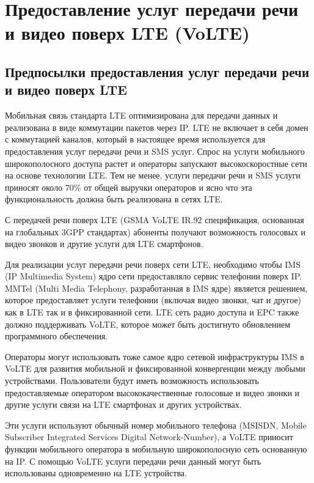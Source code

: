 \section{Предоставление услуг передачи речи и видео поверх LTE (VoLTE)} \label{sect1_4}
\subsection{Предпосылки предоставления услуг передачи речи и видео поверх LTE}


Мобильная связь стандарта LTE оптимизирована для передачи данных и реализована в виде коммутации пакетов через IP. LTE не включает в себя домен с коммутацией каналов, который в настоящее время используется для предоставления услуг передачи речи и SMS услуг. Спрос на услуги мобильного широкополосного доступа растет и операторы запускают высокоскоростные сети на основе технологии LTE. Тем не менее, услуги передачи речи и SMS услуги приносят около 70\% от общей выручки операторов и ясно что эта функциональность должна быть реализована в сетях LTE.

С передачей речи поверх LTE (GSMA VoLTE IR.92 спецификация, основанная на глобальных 3GPP стандартах) абоненты получают возможность голосовых и видео звонков и другие услуги для LTE смартфонов.

Для реализации услуг передачи речи поверх сети LTE, необходимо чтобы IMS  (IP Multimedia System) ядро сети предоставляло сервис телефонии поверх IP. MMTel  (Multi Media Telephony, разработанная в IMS ядре) является решением, которое предоставляет услуги телефонии (включая видео звонки, чат и другое) как в LTE так и в фиксированной сети. LTE сеть радио доступа и EPC также должно поддерживать VoLTE, которое может быть достигнуто обновлением программного обеспечения.

Операторы могут использовать тоже самое ядро сетевой инфраструктуры IMS в VoLTE для развития мобильной и фиксированной конвергенции между любыми устройствами.
Пользователи будут иметь возможность использовать предоставляемые оператором высококачественные голосовые и видео звонки и другие услуги связи на LTE смартфонах и других устройствах.

Эти услуги используют обычный номер мобильного телефона (MSISDN, Mobile Subscriber Integrated Services Digital Network-Number), а VoLTE приносит функции мобильного оператора в мобильную широкополосную сеть основанную на IP. С помощью VoLTE услуги передачи речи данный могут быть использованы одновременно на LTE устройства.


